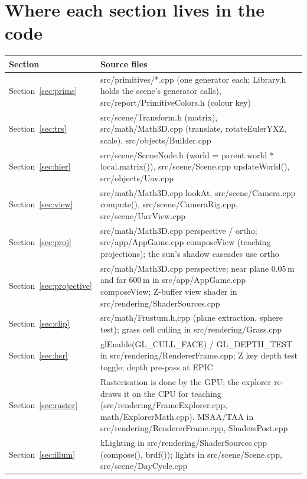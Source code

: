 \section{Where each section lives in the code}
\label{app:code}
\begin{longtable}{@{}l>{\raggedright\arraybackslash}p{14.2cm}@{}}
\toprule Section & Source files\\\midrule\endhead
\bottomrule\endfoot
Section~\ref{sec:prims} & {\raggedright\ttfamily\footnotesize src/primitives/*.cpp (one generator each; Library.h holds the scene's generator calls), src/report/PrimitiveColors.h (colour key)}\\
Section~\ref{sec:trs} & {\raggedright\ttfamily\footnotesize src/scene/Transform.h (matrix), src/math/Math3D.cpp (translate, rotateEulerYXZ, scale), src/objects/Builder.cpp}\\
Section~\ref{sec:hier} & {\raggedright\ttfamily\footnotesize src/scene/SceneNode.h (world = parent.world * local.matrix()), src/scene/Scene.cpp updateWorld(), src/objects/Uav.cpp}\\
Section~\ref{sec:view} & {\raggedright\ttfamily\footnotesize src/math/Math3D.cpp lookAt, src/scene/Camera.cpp compute(), src/scene/CameraRig.cpp, src/scene/UavView.cpp}\\
Section~\ref{sec:proj} & {\raggedright\ttfamily\footnotesize src/math/Math3D.cpp perspective / ortho; src/app/AppGame.cpp composeView (teaching projections); the sun's shadow cascades use ortho}\\
Section~\ref{sec:projective} & {\raggedright\ttfamily\footnotesize src/math/Math3D.cpp perspective; near plane 0.05\,m and far 600\,m in src/app/AppGame.cpp composeView; Z-buffer view shader in src/rendering/ShaderSources.cpp}\\
Section~\ref{sec:clip} & {\raggedright\ttfamily\footnotesize src/math/Frustum.{h,cpp} (plane extraction, sphere test); grass cell culling in src/rendering/Grass.cpp}\\
Section~\ref{sec:hsr} & {\raggedright\ttfamily\footnotesize glEnable(GL\_CULL\_FACE) / GL\_DEPTH\_TEST in src/rendering/RendererFrame.cpp; Z key depth test toggle; depth pre-pass at EPIC}\\
Section~\ref{sec:raster} & {\raggedright\ttfamily\footnotesize Rasterisation is done by the GPU; the explorer re-draws it on the CPU for teaching (src/rendering/FrameExplorer.cpp, math/ExplorerMath.cpp). MSAA/TAA in src/rendering/RendererFrame.cpp, ShadersPost.cpp}\\
Section~\ref{sec:illum} & {\raggedright\ttfamily\footnotesize kLighting in src/rendering/ShaderSources.cpp (compose(), brdf()); lights in src/scene/Scene.cpp, src/scene/DayCycle.cpp}\\

\end{longtable}
